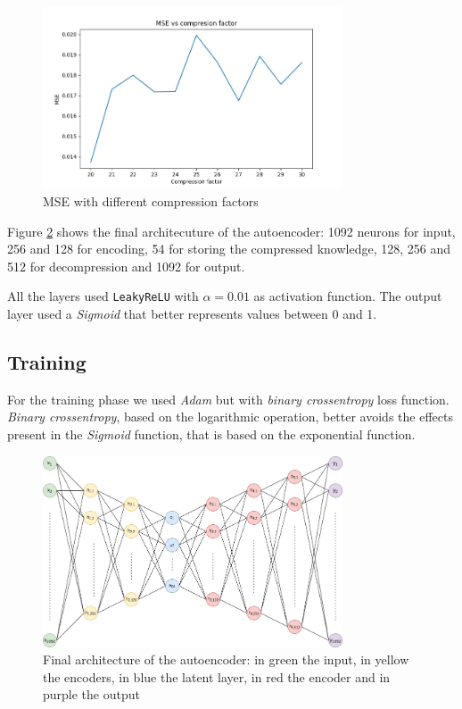 \documentclass[compsoc]{IEEEtran}
\begin{document}
\begin{figure}[ht!]
\centering                                                                        
\includegraphics[width=3.5in]{mse.png}
\captionsetup{justification=centering}                                                                                                                              
\caption{MSE with different compression factors}
\label{fig:mse}                                                                                                                                         
\end{figure}


Figure \ref{fig:auto} shows the final architecuture of the autoencoder: 1092 neurons for input, 256 and 128 for encoding, 54 for storing the compressed knowledge, 128, 256 and 512 for decompression and 1092 for output.\par
All the layers used \texttt{LeakyReLU} with $\alpha=0.01$ as activation function. The output layer used a \emph{Sigmoid} that better represents values between 0 and 1.

\subsection{Training}
For the training phase we used \emph{Adam} but with \emph{binary crossentropy} loss function. \emph{Binary crossentropy}, based on the logarithmic operation, 
better avoids the effects present in the \emph{Sigmoid} function, that is based on the exponential function.

\begin{figure}[ht!]
\centering                                                                        
\includegraphics[width=3.5in]{auto.png}
\captionsetup{justification=centering}
\caption{Final architecture of the autoencoder: in green the input, in yellow the encoders, in blue the latent layer, in red the encoder and in purple the output}
\label{fig:auto}
\end{figure}
\end{document}
